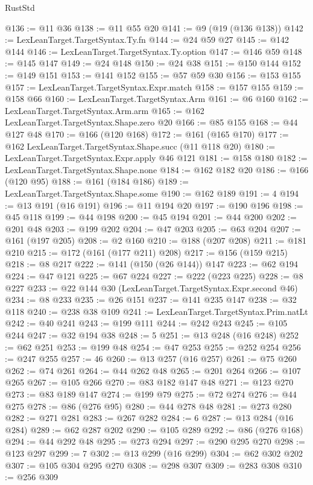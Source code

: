 \begin{lexlean}{RustStd}
\begin{coremodule}
@136 := @11 @36
@138 := @11 @55 @20
@141 := @9 (@19 (@136 @138))
@142 := LexLeanTarget.TargetSyntax.Ty.fn
@144 := @24 @59 @27
@145 := @142 @144
@146 := LexLeanTarget.TargetSyntax.Ty.option
@147 := @146 @59
@148 := @145 @147
@149 := @24 @148
@150 := @24 @38
@151 := @150 @144
@152 := @149 @151
@153 := @141 @152
@155 := @57 @59 @30
@156 := @153 @155
@157 := LexLeanTarget.TargetSyntax.Expr.match
@158 := @157 @155
@159 := @158 @66
@160 := LexLeanTarget.TargetSyntax.Arm
@161 := @6 @160
@162 := LexLeanTarget.TargetSyntax.Arm.arm
@165 := @162 LexLeanTarget.TargetSyntax.Shape.zero @20
@166 := @85 @155
@168 := @44 @127 @48
@170 := @166 (@120 @168)
@172 := @161 (@165 @170)
@177 := @162 LexLeanTarget.TargetSyntax.Shape.succ (@11 @118 @20)
@180 := LexLeanTarget.TargetSyntax.Expr.apply @46 @121
@181 := @158 @180
@182 := LexLeanTarget.TargetSyntax.Shape.none
@184 := @162 @182 @20
@186 := @166 (@120 @95)
@188 := @161 (@184 @186)
@189 := LexLeanTarget.TargetSyntax.Shape.some
@190 := @162 @189
@191 := 4
@194 := @13 @191 (@16 @191)
@196 := @11 @194 @20
@197 := @190 @196
@198 := @45 @118
@199 := @44 @198
@200 := @45 @194
@201 := @44 @200
@202 := @201 @48
@203 := @199 @202
@204 := @47 @203
@205 := @63 @204
@207 := @161 (@197 @205)
@208 := @2 @160
@210 := @188 (@207 @208)
@211 := @181 @210
@215 := @172 (@161 (@177 @211) @208)
@217 := @156 (@159 @215)
@218 := @8 @217
@222 := @141 (@150 (@26 @144)) @147
@223 := @62 @194
@224 := @47 @121
@225 := @67 @224
@227 := @222 (@223 @225)
@228 := @8 @227
@233 := @22 @144 @30 (LexLeanTarget.TargetSyntax.Expr.second @46)
@234 := @8 @233
@235 := @26 @151
@237 := @141 @235 @147
@238 := @32 @118
@240 := @238 @38 @109
@241 := LexLeanTarget.TargetSyntax.Prim.natLt
@242 := @40 @241
@243 := @199 @111
@244 := @242 @243
@245 := @105 @244
@247 := @32 @194 @38
@248 := 5
@251 := @13 @248 (@16 @248)
@252 := @62 @251
@253 := @199 @48
@254 := @47 @253
@255 := @252 @254
@256 := @247 @255
@257 := 46
@260 := @13 @257 (@16 @257)
@261 := @75 @260
@262 := @74 @261
@264 := @44 @262 @48
@265 := @201 @264
@266 := @107 @265
@267 := @105 @266
@270 := @83 @182 @147 @48
@271 := @123 @270
@273 := @83 @189 @147
@274 := @199 @79
@275 := @72 @274
@276 := @44 @275
@278 := @86 (@276 @95)
@280 := @44 @278 @48
@281 := @273 @280
@282 := @271 @281
@283 := @267 @282
@284 := 6
@287 := @13 @284 (@16 @284)
@289 := @62 @287 @202
@290 := @105 @289
@292 := @86 (@276 @168)
@294 := @44 @292 @48
@295 := @273 @294
@297 := @290 @295 @270
@298 := @123 @297
@299 := 7
@302 := @13 @299 (@16 @299)
@304 := @62 @302 @202
@307 := @105 @304 @295 @270
@308 := @298 @307
@309 := @283 @308
@310 := @256 @309

\end{coremodule}
\end{lexlean}
